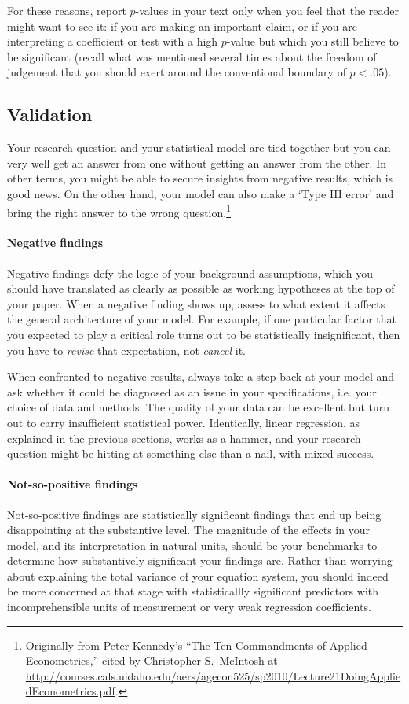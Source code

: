 For these reasons, report $p$-values in your text only when you feel that the reader might want to see it: if you are making an important claim, or if you are interpreting a coefficient or test with a high $p$-value but which you still believe to be significant (recall what was mentioned several times about the freedom of judgement that you should exert around the conventional boundary of $p < .05$).

\subsection{Validation}

Your research question and your statistical model are tied together but you can very well get an answer from one without getting an answer from the other. In other terms, you might be able to secure insights from negative results, which is good news. On the other hand, your model can also make a `Type III error' and bring the right answer to the wrong question.\footnote{Originally from Peter Kennedy's ``The Ten Commandments of Applied Econometrics,'' cited by Christopher S.~McIntosh at \url{http://courses.cals.uidaho.edu/aers/agecon525/sp2010/Lecture21DoingAppliedEconometrics.pdf}.}

\paragraph{Negative findings} Negative findings defy the logic of your background assumptions, which you should have translated as clearly as possible as working hypotheses at the top of your paper. When a negative finding shows up, assess to what extent it affects the general architecture of your model. For example, if one particular factor that you expected to play a critical role turns out to be statistically insignificant, then you have to \emph{revise} that expectation, not \emph{cancel} it.

When confronted to negative results, always take a step back at your model and ask whether it could be diagnosed as an issue in your specifications, i.e. your choice of data and methods. The quality of your data can be excellent but turn out to carry insufficient statistical power. Identically, linear regression, as explained in the previous sections, works as a hammer, and your research question might be hitting at something else than a nail, with mixed success.

\paragraph{Not-so-positive findings} Not-so-positive findings are statistically significant findings that end up being disappointing at the substantive level. The magnitude of the effects in your model, and its interpretation in natural units, should be your benchmarks to determine how substantively significant your findings are. Rather than worrying about explaining the total variance of your equation system, you should indeed be more concerned at that stage with statisticallly significant predictors with incomprehensible units of measurement or very weak regression coefficients.


